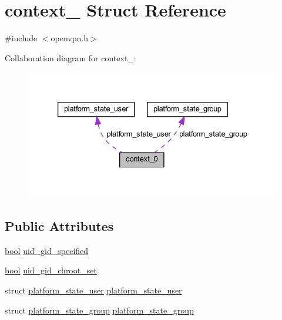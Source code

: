 \hypertarget{structcontext__0}{}\section{context\+\_ Struct Reference}
\label{structcontext__0}


{\ttfamily \#include $<$openvpn.\+h$>$}



Collaboration diagram for context\+\_\+:
\nopagebreak
\begin{figure}[H]
\begin{center}
\leavevmode
\includegraphics[width=333pt]{structcontext__0__coll__graph}
\end{center}
\end{figure}
\subsection*{Public Attributes}
\begin{DoxyCompactItemize}
\item 
\hyperlink{automatic_8c_abb452686968e48b67397da5f97445f5b}{bool} \hyperlink{structcontext__0_af599a649761ec7fd83b5aa3dab4a502e}{uid\+\_\+gid\+\_\+specified}
\item 
\hyperlink{automatic_8c_abb452686968e48b67397da5f97445f5b}{bool} \hyperlink{structcontext__0_adf83164d54c6c56957e5550a45b63338}{uid\+\_\+gid\+\_\+chroot\+\_\+set}
\item 
struct \hyperlink{structplatform__state__user}{platform\+\_\+state\+\_\+user} \hyperlink{structcontext__0_a663b5e3cf38a4fc003b34fed87e9555c}{platform\+\_\+state\+\_\+user}
\item 
struct \hyperlink{structplatform__state__group}{platform\+\_\+state\+\_\+group} \hyperlink{structcontext__0_a2b214a974983a9c9f74e3c80dc1f0161}{platform\+\_\+state\+\_\+group}
\end{DoxyCompactItemize}



